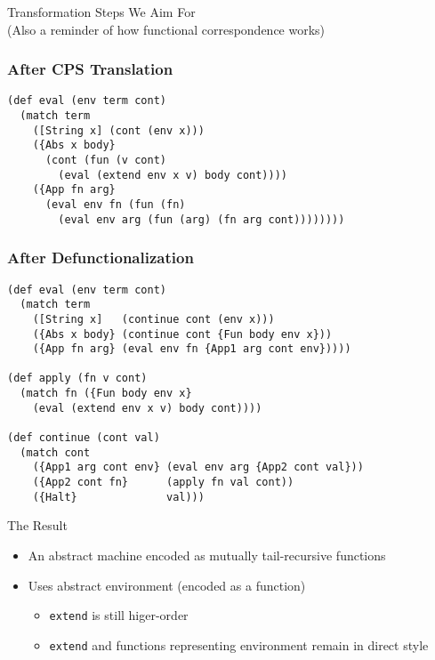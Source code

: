 \documentclass[handout]{beamer}
\begin{document}
\begin{frame}
  \begin{center}
    \LARGE{Transformation Steps We Aim For}\\
    \tiny{(Also a reminder of how functional correspondence works)}
  \end{center}
\end{frame}

\begin{frame}[fragile]
  \frametitle{After CPS Translation}
  \begin{lstlisting}
(def eval (env term cont)
  (match term
    ([String x] (cont (env x)))
    ({Abs x body}
      (cont (fun (v cont)
        (eval (extend env x v) body cont))))
    ({App fn arg}
      (eval env fn (fun (fn)
        (eval env arg (fun (arg) (fn arg cont))))))))
  \end{lstlisting}
\end{frame}

\begin{frame}[fragile]
  \frametitle{After Defunctionalization}
  \begin{lstlisting}
(def eval (env term cont)
  (match term
    ([String x]   (continue cont (env x)))
    ({Abs x body} (continue cont {Fun body env x}))
    ({App fn arg} (eval env fn {App1 arg cont env}))))

(def apply (fn v cont)
  (match fn ({Fun body env x}
    (eval (extend env x v) body cont))))

(def continue (cont val)
  (match cont
    ({App1 arg cont env} (eval env arg {App2 cont val}))
    ({App2 cont fn}      (apply fn val cont))
    ({Halt}              val)))
  \end{lstlisting}
\end{frame}

\begin{frame}{The Result}
  \begin{itemize}
    \item An abstract machine encoded as mutually tail-recursive functions \pause
    \item Uses abstract environment (encoded as a function)
    \begin{itemize} \pause
      \item \lstinline{extend} is still higer-order
      \item \lstinline{extend} and functions representing environment remain in direct style
    \end{itemize}
  \end{itemize}
\end{frame}
\end{document}
